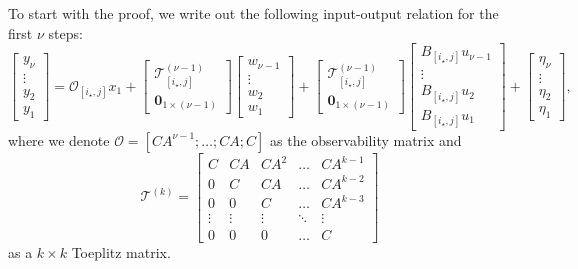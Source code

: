 \documentclass[11pt, twoside]{article}
\theoremstyle{definition}
\newcommand{\tbo}[2]{\begin{bmatrix}#1 \\ #2\end{bmatrix}}
\begin{document}
To start with the proof, we write out the following input-output relation for the first $\nu$ steps:
\begin{equation}
\label{equ:obs-dynamics-app}
\begin{bmatrix} y_\nu \\ \vdots \\y_2 \\ y_1 \end{bmatrix}
=
\mathcal{O}_{[i_\star, j]} x_1
+
\tbo{\mathcal{T}^{(\nu-1)}_{[i_\star, j]}}{\mathbf{0}_{1 \times (\nu-1)}}
\begin{bmatrix} w_{\nu-1} \\ \vdots \\w_2 \\ w_1  \end{bmatrix}
+
\tbo{\mathcal{T}^{(\nu-1)}_{[i_\star, j]}}{\mathbf{0}_{1 \times (\nu-1)}}
\begin{bmatrix} B_{[i_\star, j]}u_{\nu-1} \\ \vdots \\ B_{[i_\star, j]}u_2 \\ B_{[i_\star, j]}u_1  \end{bmatrix}
+
\begin{bmatrix} \eta_\nu \\ \vdots \\ \eta_2 \\ \eta_1  \end{bmatrix},
\end{equation}
where we denote $\mathcal{O} = [CA^{\nu-1}; \dots; CA; C]$ as the observability matrix and
\[\mathcal{T}^{(k)} = \begin{bmatrix} 
    C & CA & CA^2 & \dots & CA^{k-1} \\
    0 & C & CA & \dots & CA^{k-2} \\
    0 & 0 & C & \dots & CA^{k-3}\\
    \vdots & \vdots & \vdots & \ddots & \vdots \\
    0 & 0 & 0 & \dots & C
\end{bmatrix}\]
as a $k \times k$ Toeplitz matrix.
\end{document}
